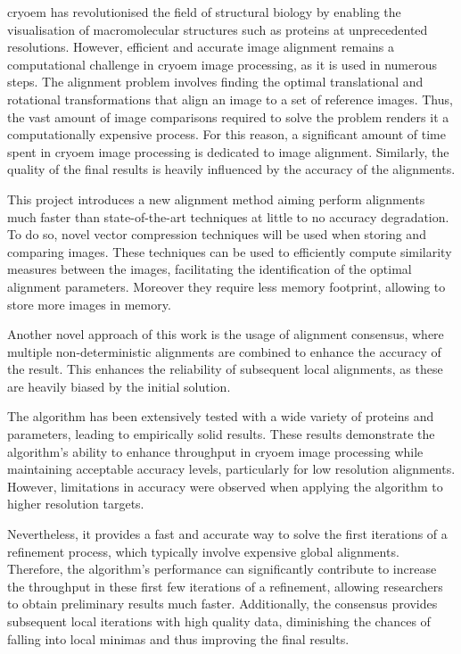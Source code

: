 \documentclass[../main.tex]{subfiles}
\begin{document}
\gls{cryoem} has revolutionised the field of structural biology by enabling the visualisation of macromolecular structures such as proteins at unprecedented resolutions. However, efficient and accurate image alignment remains a computational challenge in \gls{cryoem} image processing, as it is used in numerous steps. The alignment problem involves finding the optimal translational and rotational transformations that align an image to a set of reference images. Thus, the vast amount of image comparisons required to solve the problem renders it a computationally expensive process. For this reason, a significant amount of time spent in \gls{cryoem} image processing is dedicated to image alignment. Similarly, the quality of the final results is heavily influenced by the accuracy of the alignments.

This project introduces a new alignment method aiming perform alignments much faster than state-of-the-art techniques at little to no accuracy degradation. To do so, novel vector compression techniques will be used when storing and comparing images. These techniques can be used to efficiently compute similarity measures between the images, facilitating the identification of the optimal alignment parameters. Moreover they require less memory footprint, allowing to store more images in memory.

Another novel approach of this work is the usage of alignment consensus, where multiple non-deterministic alignments are combined to enhance the accuracy of the result. This enhances the reliability of subsequent local alignments, as these are heavily biased by the initial solution.  

The algorithm has been extensively tested with a wide variety of proteins and parameters, leading to empirically solid results. These results demonstrate the algorithm's ability to enhance throughput in \gls{cryoem} image processing while maintaining acceptable accuracy levels, particularly for low resolution alignments. However, limitations in accuracy were observed when applying the algorithm to higher resolution targets.

Nevertheless, it provides a fast and accurate way to solve the first iterations of a refinement process, which typically involve expensive global alignments. Therefore, the algorithm's performance can significantly contribute to increase the throughput in these first few iterations of a refinement, allowing researchers to obtain preliminary results much faster. Additionally, the consensus provides subsequent local iterations with high quality data, diminishing the chances of falling into local minimas and thus improving the final results.
\end{document}
